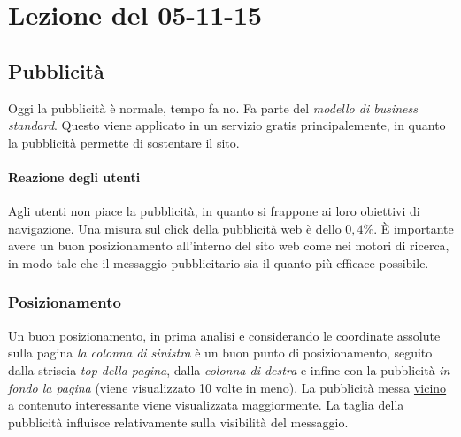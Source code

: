 \section{Lezione del 05-11-15}

\subsection{Pubblicit\`a}

Oggi la pubblicit\`a \`e normale, tempo fa no. Fa parte del \textit{modello di business standard}. Questo viene applicato in un servizio gratis principalemente, in quanto la pubblicit\`a permette di sostentare il sito.

\paragraph*{Reazione degli utenti}Agli utenti non piace la pubblicit\`a, in quanto si frappone ai loro obiettivi di navigazione. Una misura sul click della pubblicit\`a web \`e dello $0,4\%$. \`E importante avere un buon posizionamento all'interno del sito web come nei motori di ricerca, in modo tale che il messaggio pubblicitario sia il quanto pi\`u efficace possibile.

\subsubsection{Posizionamento}Un buon posizionamento, in prima analisi e considerando le coordinate assolute sulla pagina \textit{la colonna di sinistra} \`e un buon punto di posizionamento, seguito dalla striscia\textit{ top della pagina}, dalla \textit{colonna di destra} e infine con la pubblicit\`a \textit{in fondo la pagina} (viene visualizzato 10 volte in meno).
La pubblicit\`a messa \underline{vicino} a contenuto interessante viene visualizzata maggiormente.
La taglia della pubblicit\`a influisce relativamente sulla visibilit\`a del messaggio.

